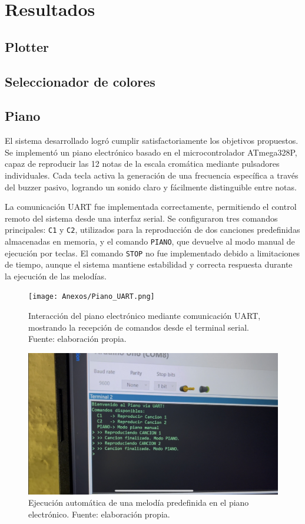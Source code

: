 \vspace{0.8cm}

\section{Resultados}
\subsection{Plotter}

\subsection{Seleccionador de colores}

\subsection{Piano}
El sistema desarrollado logró cumplir satisfactoriamente los objetivos propuestos. Se implementó un piano electrónico basado en el microcontrolador ATmega328P, capaz de reproducir las 12 notas de la escala cromática mediante pulsadores individuales. Cada tecla activa la generación de una frecuencia específica a través del buzzer pasivo, logrando un sonido claro y fácilmente distinguible entre notas.

La comunicación UART fue implementada correctamente, permitiendo el control remoto del sistema desde una interfaz serial. Se configuraron tres comandos principales: \texttt{C1} y \texttt{C2}, utilizados para la reproducción de dos canciones predefinidas almacenadas en memoria, y el comando \texttt{PIANO}, que devuelve al modo manual de ejecución por teclas. El comando \texttt{STOP} no fue implementado debido a limitaciones de tiempo, aunque el sistema mantiene estabilidad y correcta respuesta durante la ejecución de las melodías.

\begin{figure}[H]
    \centering
    \texttt{[image: Anexos/Piano\_UART.png]}
    \caption{Interacción del piano electrónico mediante comunicación UART, mostrando la recepción de comandos desde el terminal serial. Fuente: elaboración propia.}
    \label{fig:piano_uart}
\end{figure}

\begin{figure}[H]
    \centering
    \includegraphics[width=0.7\columnwidth]{Anexos/Piano_Cancion.png}
    \caption{Ejecución automática de una melodía predefinida en el piano electrónico. Fuente: elaboración propia.}
    \label{fig:piano_cancion}
\end{figure}


